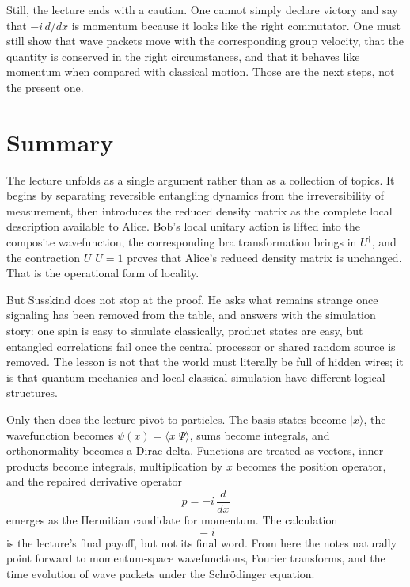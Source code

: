 Still, the lecture ends with a caution. One cannot simply declare victory and say that \(-i\,d/dx\) is momentum because it looks like the right commutator. One must still show that wave packets move with the corresponding group velocity, that the quantity is conserved in the right circumstances, and that it behaves like momentum when compared with classical motion. Those are the next steps, not the present one.

\section{Summary}

The lecture unfolds as a single argument rather than as a collection of topics. It begins by separating reversible entangling dynamics from the irreversibility of measurement, then introduces the reduced density matrix as the complete local description available to Alice. Bob's local unitary action is lifted into the composite wavefunction, the corresponding bra transformation brings in \(U^\dagger\), and the contraction \(U^\dagger U=1\) proves that Alice's reduced density matrix is unchanged. That is the operational form of locality.

But Susskind does not stop at the proof. He asks what remains strange once signaling has been removed from the table, and answers with the simulation story: one spin is easy to simulate classically, product states are easy, but entangled correlations fail once the central processor or shared random source is removed. The lesson is not that the world must literally be full of hidden wires; it is that quantum mechanics and local classical simulation have different logical structures.

Only then does the lecture pivot to particles. The basis states become \(|x\rangle\), the wavefunction becomes \(\psi(x)=\langle x|\Psi\rangle\), sums become integrals, and orthonormality becomes a Dirac delta. Functions are treated as vectors, inner products become integrals, multiplication by \(x\) becomes the position operator, and the repaired derivative operator
\begin{equation}
p=-i\,\frac{d}{dx}
\end{equation}
emerges as the Hermitian candidate for momentum. The calculation
\begin{equation}
[x,p]=i
\end{equation}
is the lecture's final payoff, but not its final word. From here the notes naturally point forward to momentum-space wavefunctions, Fourier transforms, and the time evolution of wave packets under the Schr\"odinger equation.
